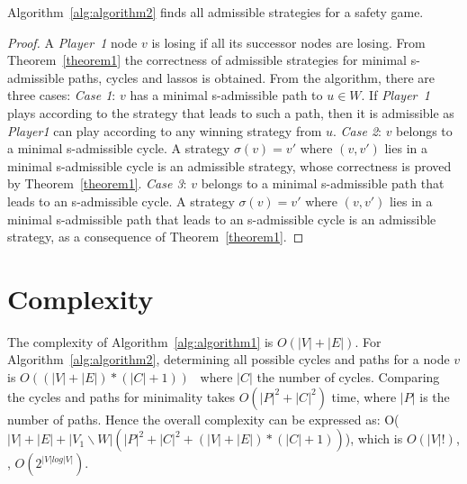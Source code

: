 \begin{corollary}
	Algorithm~\ref{alg:algorithm2} finds all admissible strategies for a safety game.
\end{corollary}
\begin{proof}
	A \textit{Player~1} node $v$ is losing if all its successor nodes are losing. From Theorem~\ref{theorem1} the correctness of admissible strategies for minimal s-admissible paths, cycles and lassos is obtained. From the algorithm, there are three cases:
	\newline \textit{Case 1}: $v$ has a minimal s-admissible path to $u \in W$. If \textit{Player~1} plays according to the strategy that leads to such a path, then it is admissible as \textit{Player1} can play according to any winning strategy from $u$.
	\newline \textit{Case 2}: $v$ belongs to a minimal s-admissible cycle. A strategy $\sigma(v) = v'$ where $(v,v')$ lies in a minimal s-admissible cycle is an admissible strategy, whose correctness is proved by Theorem~\ref{theorem1}. 
	\newline \textit{Case 3}: $v$ belongs to a minimal s-admissible path that leads to an s-admissible cycle. A strategy $\sigma(v) = v'$ where $(v,v')$ lies in a minimal s-admissible path that leads to an s-admissible cycle is an admissible strategy, as a consequence of Theorem~\ref{theorem1}. 
\end{proof}

\section{Complexity}
The complexity of Algorithm~\ref{alg:algorithm1} is $O(|V| +
|E|)$. For Algorithm~\ref{alg:algorithm2}, determining all possible cycles and
paths for a node $v$ is
$O((|V|+|E|)*(|C|+1))$~\cite{ElementaryCircuits} where $|C|$ the
number of cycles. Comparing the cycles and paths for minimality takes
$O(|P|^{2} + |C|^{2})$ time, where $|P|$ is the number of paths. Hence
the overall complexity can be expressed as: O($|V| + |E| + |V_{1}
\backslash W|(|P|^{2} + |C|^{2} + (|V|+|E|)*(|C|+1))$), which is
$O(|V|!)$, \ie, $O(2^{|V|log|V|})$.
